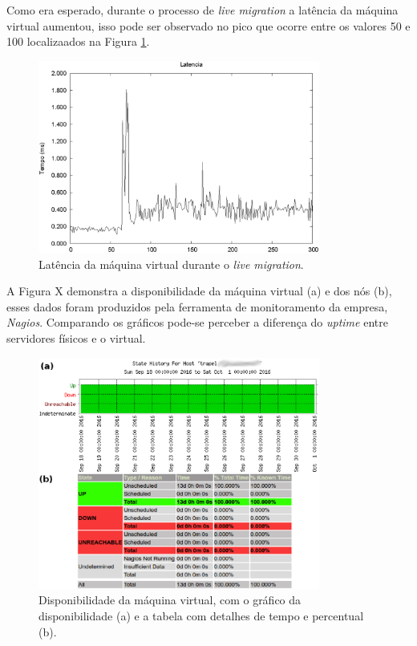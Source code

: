 Como era esperado, durante o processo de \textit{live migration} a latência da máquina virtual aumentou, isso pode ser observado no pico que
ocorre entre os valores 50 e 100 localizaados na Figura \ref{fig:teste2_latencia}.
\begin{figure}[h!]
 \centering
 \includegraphics[width=350px]{img/teste2_latencia.eps}
 \caption{Latência da máquina virtual durante o \textit{live migration}.}
 \label{fig:teste2_latencia}
\end{figure}

A Figura X demonstra a disponibilidade da máquina virtual (a) e dos nós (b), esses dados foram produzidos pela ferramenta de monitoramento da 
empresa, \textit{Nagios}. Comparando os gráficos pode-se perceber a diferença do \textit{uptime} entre servidores físicos e o virtual.
\begin{figure}[h!]
 \centering
 \includegraphics[width=350px]{img/teste2_trapel1.eps}
 \caption{Disponibilidade da máquina virtual, com o gráfico da disponibilidade (a) e a tabela com detalhes de tempo e percentual (b).}
 \label{fig:teste2_trapel1}
\end{figure}

